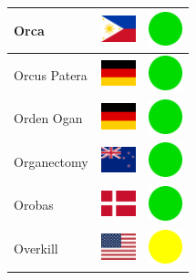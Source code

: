 \documentclass[12pt, a4paper, twoside]{report}
\begin{document}
\begin{center}
\begin{longtable}{|p{5cm}|p{2cm}|p{2cm}|}
 Orca                                                       & \includegraphics[width=1cm]{../4x3/ph} &   \includegraphics[width=1cm]{../likes/y} \\ \hline
 Orcus Patera                                               & \includegraphics[width=1cm]{../4x3/de} &   \includegraphics[width=1cm]{../likes/y} \\ \hline
 Orden Ogan                                                 & \includegraphics[width=1cm]{../4x3/de} &   \includegraphics[width=1cm]{../likes/y} \\ \hline
 Organectomy                                                & \includegraphics[width=1cm]{../4x3/nz} &   \includegraphics[width=1cm]{../likes/y} \\ \hline
 Orobas                                                     & \includegraphics[width=1cm]{../4x3/dk} &   \includegraphics[width=1cm]{../likes/y} \\ \hline
 Overkill                                                   & \includegraphics[width=1cm]{../4x3/us} &   \includegraphics[width=1cm]{../likes/m} \\ \hline

\end{longtable}
\end{center}
\end{document}

